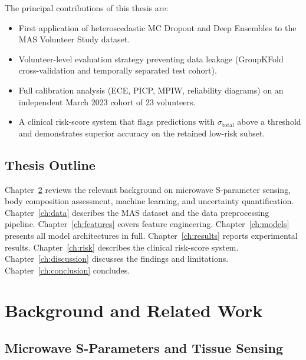 \documentclass[12pt, a4paper, oneside]{report}
\begin{document}
The principal contributions of this thesis are:
\begin{itemize}[noitemsep]
  \item First application of heteroscedastic MC Dropout and Deep Ensembles to the MAS Volunteer Study dataset.
  \item Volunteer-level evaluation strategy preventing data leakage (GroupKFold cross-validation and temporally separated test cohort).
  \item Full calibration analysis (ECE, PICP, MPIW, reliability diagrams) on an independent March 2023 cohort of 23 volunteers.
  \item A clinical risk-score system that flags predictions with $\sigma_{\mathrm{total}}$ above a threshold and demonstrates superior accuracy on the retained low-risk subset.
\end{itemize}

\section{Thesis Outline}

Chapter~\ref{ch:background} reviews the relevant background on microwave S-parameter sensing, body composition assessment, machine learning, and uncertainty quantification. Chapter~\ref{ch:data} describes the MAS dataset and the data preprocessing pipeline. Chapter~\ref{ch:features} covers feature engineering. Chapter~\ref{ch:models} presents all model architectures in full. Chapter~\ref{ch:results} reports experimental results. Chapter~\ref{ch:risk} describes the clinical risk-score system. Chapter~\ref{ch:discussion} discusses the findings and limitations. Chapter~\ref{ch:conclusion} concludes.

\chapter{Background and Related Work}
\label{ch:background}

\section{Microwave S-Parameters and Tissue Sensing}
\end{document}
